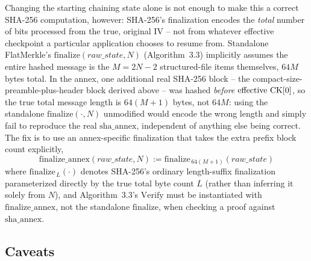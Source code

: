 Changing the starting chaining state alone is not enough to make this a
correct SHA-256 computation, however: SHA-256's finalization encodes the
\emph{total} number of bits processed from the true, original
$\mathrm{IV}$ -- not from whatever effective checkpoint a particular
application chooses to resume from. Standalone FlatMerkle's
$\mathrm{finalize}(\mathit{raw\_state}, N)$ (Algorithm~3.3) implicitly
assumes the entire hashed message is the $M = 2N-2$ structured-file items
themselves, $64M$ bytes total. In the annex, one additional real SHA-256
block -- the compact-size-preamble-plus-header block derived above -- was
hashed \emph{before} $\mathrm{effective}~\mathrm{CK}[0]$, so the true total message
length is $64(M+1)$ bytes, not $64M$: using the standalone
$\mathrm{finalize}(\cdot, N)$ unmodified would encode the wrong length and
simply fail to reproduce the real $\mathrm{sha\_annex}$, independent of
anything else being correct. The fix is to use an annex-specific
finalization that takes the extra prefix block count explicitly,
\begin{equation}
\mathrm{finalize\_annex}(\mathit{raw\_state}, N) := \mathrm{finalize}_{\,64(M+1)}(\mathit{raw\_state})
\end{equation}
where $\mathrm{finalize}_{\,L}(\cdot)$ denotes SHA-256's ordinary
length-suffix finalization parameterized directly by the true total byte
count $L$ (rather than inferring it solely from $N$), and
Algorithm~3.3's $\mathrm{Verify}$ must be instantiated with
$\mathrm{finalize\_annex}$, not the standalone $\mathrm{finalize}$, when
checking a proof against $\mathrm{sha\_annex}$.

\subsection{Caveats}

